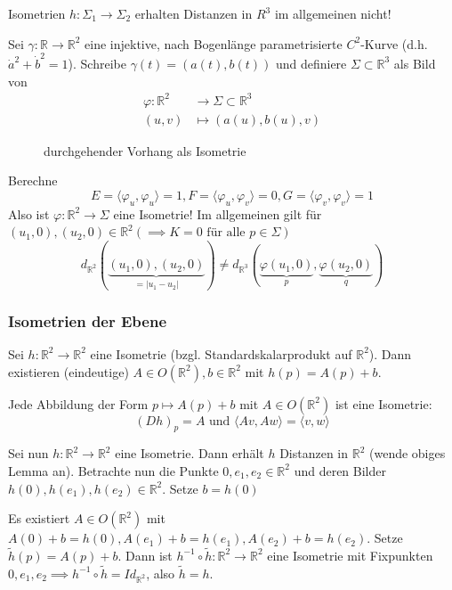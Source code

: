 \documentclass[../main.tex]{subfiles}
\begin{document}
\begin{remark}
    Isometrien $h: \Sigma_1 \to \Sigma_2$ erhalten Distanzen in $R^3$ im allgemeinen nicht!
\end{remark}
\begin{example}
    Sei $\gamma : \mathbb{R} \to \mathbb{R}^2$ eine injektive, nach Bogenlänge parametrisierte $C^2$-Kurve (d.h. $\dot{a}^2+\dot{b}^2=1$).
    Schreibe $\gamma(t)=(a(t),b(t))$ und definiere $\Sigma \subset \mathbb{R}^3$ als Bild von
    \begin{align*}
        \varphi : \mathbb{R}^2 &\to \Sigma \subset \mathbb{R}^3 \\
        (u,v) &\mapsto (a(u),b(u),v)
    \end{align*}
    \begin{figure}[H]
        \centering
        \def\svgwidth{15em}
        
        \caption*{durchgehender Vorhang als Isometrie}        
    \end{figure}
    \noindent Berechne $$E=\langle \varphi_u, \varphi_u \rangle = 1, F=\langle \varphi_u, \varphi_v \rangle = 0, G=\langle \varphi_v, \varphi_v \rangle = 1$$
    Also ist $\varphi : \mathbb{R}^2 \to \Sigma$ eine Isometrie! Im allgemeinen gilt für $(u_1,0),(u_2,0)\in \mathbb{R}^2 (\implies K=0 \text{ für alle } p \in \Sigma)$
    $$d_{\mathbb{R}^2}(\underbrace{(u_1, 0), (u_2, 0)}_{=|u_1 - u_2|}) \not = d_{\mathbb{R}^3}(\underbrace{\varphi(u_1,0)}_{p},\underbrace{\varphi(u_2,0)}_{q})$$
\end{example}

\subsubsection*{Isometrien der Ebene}
Sei $h:\mathbb{R}^2 \to \mathbb{R}^2$ eine Isometrie (bzgl. Standardskalarprodukt auf $\mathbb{R}^2$).
Dann existieren (eindeutige) $A \in O(\mathbb{R}^2), b \in \mathbb{R}^2$ mit $h(p)=A(p)+b$.
\begin{remark}
    Jede Abbildung der Form $p \mapsto A(p)+b$ mit $A\in O(\mathbb{R}^2)$ ist eine Isometrie:
    $$(Dh)_p = A \text{ und } \langle Av, Aw \rangle = \langle v, w \rangle$$
\end{remark}
Sei nun $h : \mathbb{R}^2 \to \mathbb{R}^2$ eine Isometrie. Dann erhält $h$ Distanzen in $\mathbb{R}^2$ (wende obiges Lemma an).
Betrachte nun die Punkte $0, e_1, e_2 \in \mathbb{R}^2$ und deren Bilder $h(0), h(e_1), h(e_2) \in \mathbb{R}^2$.
Setze $b=h(0)$
\begin{figure}[H]
    \centering
    \def\svgwidth{\textwidth}
    
\end{figure}
Es existiert $A\in O(\mathbb{R}^2)$ mit $A(0)+b=h(0), A(e_1)+b=h(e_1), A(e_2)+b = h(e_2)$.
Setze $\tilde{h}(p)=A(p)+b$. Dann ist $h^{-1}\circ \tilde{h}: \mathbb{R}^2 \to \mathbb{R}^2$ eine Isometrie mit Fixpunkten $0,e_1,e_2 \implies h^{-1}\circ \tilde{h} = Id_{\mathbb{R}^2}$, also $\tilde{h}= h$.
\end{document}
